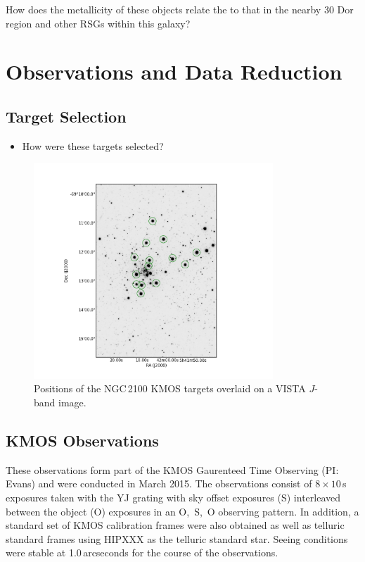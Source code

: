 \documentclass[useAMS,usenatbib]{mn2e}
\begin{document}
How does the metallicity of these objects relate the to that in the nearby 30 Dor region and other RSGs within this galaxy?



\section{Observations and Data Reduction} %
\label{sec:observations}
\subsection{Target Selection} %
\label{sub:target_selection}

\begin{itemize}
  \item How were these targets selected?
\end{itemize}

\begin{figure}
 \includegraphics[width=9.0cm]{NGC2100-targets}
 \caption{Positions of the NGC\,2100 KMOS targets overlaid on a VISTA $J$-band image.
\label{fig:targets}
          }
\end{figure}

\subsection{KMOS Observations} %
\label{sub:kmos_observations}

These observations form part of the KMOS Gaurenteed Time Observing (PI: Evans) and were conducted in March 2015.
The observations consist of $8\times10$\,s exposures taken with the YJ grating with sky offset exposures (S) interleaved between the object (O) exposures in an O,~S,~O observing pattern.
In addition, a standard set of KMOS calibration frames were also obtained as well as telluric standard frames using HIPXXX as the telluric standard star.
Seeing conditions were stable at 1.0\,arcseconds for the course of the observations.
\end{document}
